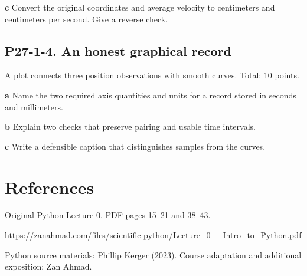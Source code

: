\documentclass[11pt,letterpaper]{article}
\theoremstyle{definition}\newtheorem{definition}{Definition}\newtheorem{example}{Example}
\numberwithin{equation}{section}
\begin{document}
\textbf{c} Convert the original coordinates and average velocity to centimeters and centimeters per second. Give a reverse check.

\par\noindent\begin{minipage}{\linewidth}
\subsection*{P27-1-4. An honest graphical record}
A plot connects three position observations with smooth curves. Total: 10 points.

\textbf{a} Name the two required axis quantities and units for a record stored in seconds and millimeters.

\end{minipage}\par\medskip
\textbf{b} Explain two checks that preserve pairing and usable time intervals.

\textbf{c} Write a defensible caption that distinguishes samples from the curves.

\section*{References}
\noindent\begin{minipage}{\linewidth}
Original Python Lecture 0. PDF pages 15--21 and 38--43.

\url{https://zanahmad.com/files/scientific-python/Lecture_0__Intro_to_Python.pdf}
\end{minipage}\par\medskip
Python source materials: Phillip Kerger (2023). Course adaptation and additional exposition: Zan Ahmad.
\end{document}
